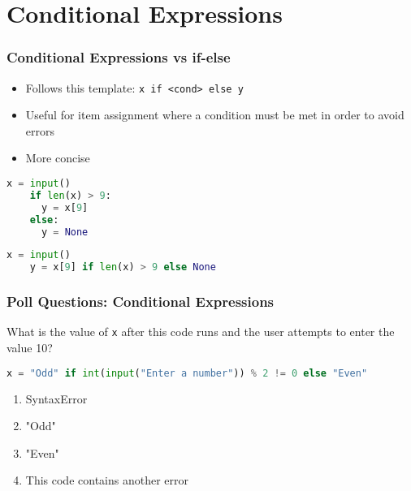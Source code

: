 \documentclass{beamer}
\begin{document}
\section{Conditional Expressions}
\begin{frame}[fragile]
  \frametitle{Conditional Expressions vs if-else}

  \begin{itemize}
    \item Follows this template: \lstinline|x if <cond> else y|
    \item Useful for item assignment where a condition must be met in order to avoid errors
    \item More concise
  \end{itemize}
  \vfill
  \begin{minipage}{0.49\textwidth}
    \begin{lstlisting}[language=Python, autogobble]
    x = input()
    if len(x) > 9:
      y = x[9]
    else:
      y = None
    \end{lstlisting}
  \end{minipage}
  \begin{minipage}{0.49\textwidth}
    \begin{lstlisting}[language=Python, autogobble]
    x = input()
    y = x[9] if len(x) > 9 else None
    \end{lstlisting}
  \end{minipage}
\end{frame}

%
%
\begin{frame}[fragile]
  \frametitle{Poll Questions: Conditional Expressions}
  What is the value of \lstinline|x| after this code runs and the user attempts to enter the value 10?
  \begin{lstlisting}[language=Python, autogobble]
  x = "Odd" if int(input("Enter a number")) % 2 != 0 else "Even"
  \end{lstlisting}
  \vfill
  \begin{enumerate}[A]
    \item SyntaxError
    \item "Odd"
    \item "Even"
    \item This code contains another error
  \end{enumerate}
\end{frame}
\end{document}
